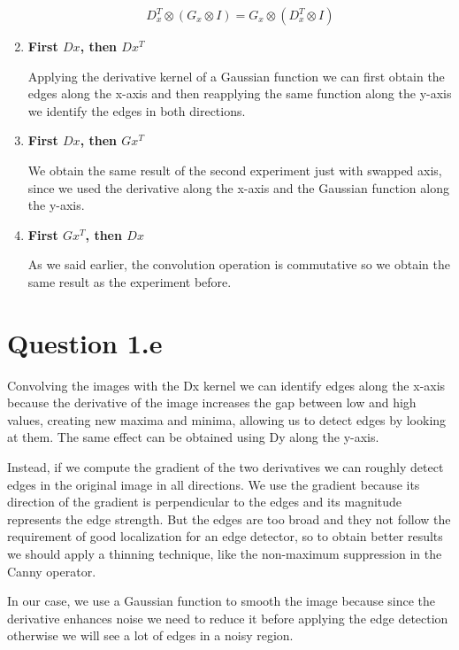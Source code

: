 \documentclass{article}
\begin{document}
\begin{enumerate}
\begin{equation}
D_x^T \otimes (G_x \otimes I) = G_x \otimes (D_x^T \otimes I)
\end{equation}

\item \textbf{First $Dx$, then $Dx^T$}

Applying the derivative kernel of a Gaussian function we can first obtain the edges along the x-axis and then reapplying the same function along the y-axis we identify the edges in both directions.

\item \textbf{First $Dx$, then $Gx^T$}

We obtain the same result of the second experiment just with swapped axis, since we used the derivative along the x-axis and the Gaussian function along the y-axis.

\item \textbf{First $Gx^T$, then $Dx$}

As we said earlier, the convolution operation is commutative so we obtain the same result as the experiment before.

\end{enumerate}

\section*{Question 1.e}

Convolving the images with the Dx kernel we can identify edges along the x-axis because the derivative of the image increases the gap between low and high values, creating new maxima and minima, allowing us to detect edges by looking at them. The same effect can be obtained using Dy along the y-axis.

Instead, if we compute the gradient of the two derivatives we can roughly detect edges in the original image in all directions. We use the gradient because its direction of the gradient is perpendicular to the edges and its magnitude represents the edge strength.
But the edges are too broad and they not follow the requirement of good localization for an edge detector, so to obtain better results we should apply a thinning technique, like the non-maximum suppression in the Canny operator.

In our case, we use a Gaussian function to smooth the image because since the derivative enhances noise we need to reduce it before applying the edge detection otherwise we will see a lot of edges in a noisy region.
\end{document}
